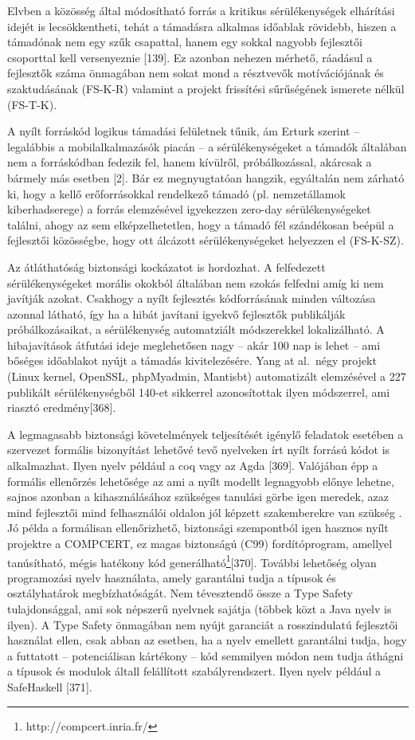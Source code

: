 \documentclass[12pt,magyar,a4paper,oneside]{scrreprt}
\begin{document}
Elvben a közösség által módosítható forrás a kritikus sérülékenységek
elhárítási idejét is lecsökkentheti, tehát a támadásra alkalmas időablak
rövidebb, hiszen a támadónak nem egy szűk csapattal, hanem egy sokkal
nagyobb fejlesztői csoporttal kell versenyeznie {[}139{]}. Ez azonban
nehezen mérhető, ráadásul a fejlesztők száma önmagában nem sokat mond a
résztvevők motívációjának és szaktudásának (FS-K-R) valamint a projekt
frissítési sűrűségének ismerete nélkül (FS-T-K).

A nyílt forráskód logikus támadási felületnek tűnik, ám Erturk szerint
-- legalábbis a mobilalkalmazásók piacán -- a sérülékenységeket a
támadók általában nem a forráskódban fedezik fel, hanem kívülről,
próbálkozással, akárcsak a bármely más esetben {[}2{]}. Bár ez
megnyugtatóan hangzik, egyáltalán nem zárható ki, hogy a kellő
erőforrásokkal rendelkező támadó (pl. nemzetállamok kiberhadserege) a
forrás elemzésével igyekezzen zero-day sérülékenységeket találni, ahogy
az sem elképzelhetetlen, hogy a támadó fél szándékosan beépül a
fejlesztői közösségbe, hogy ott álcázott sérülékenységeket helyezzen el
(FS-K-SZ).

Az átláthatóság biztonsági kockázatot is hordozhat. A felfedezett
sérülékenységeket morális okokból általában nem szokás felfedni amíg ki
nem javítják azokat. Csakhogy a nyílt fejlesztés kódforrásának minden
változása azonnal látható, így ha a hibát javítani igyekvő fejlesztők
publikálják próbálkozásaikat, a sérülékenység automatziált módszerekkel
lokalizálható. A hibajavítások átfutási ideje meglehetősen nagy -- akár
100 nap is lehet -- ami bőséges időablakot nyújt a támadás
kivitelezésére. Yang at al.~négy projekt (Linux kernel, OpenSSL,
phpMyadmin, Mantisbt) automatizált elemzésével a 227 publikált
sérülékenységből 140-et sikkerrel azonosítottak ilyen módszerrel, ami
riasztó eredmény{[}368{]}.

A legmagasabb biztonsági követelmények teljesítését igénylő feladatok
esetében a szervezet formális bizonyítást lehetővé tevő nyelveken írt
nyílt forrású kódot is alkalmazhat. Ilyen nyelv például a coq vagy az
Agda {[}369{]}. Valójában épp a formális ellenőrzés lehetősége az ami a
nyílt modellt legnagyobb előnye lehetne, sajnos azonban a
kihasználásához szükséges tanulási görbe igen meredek, azaz mind
fejlesztői mind felhasználói oldalon jól képzett szakemberekre van
szükség . Jó példa a formálisan ellenőrizhető, biztonsági szempontból
igen hasznos nyílt projektre a COMPCERT, ez magas biztonságú (C99)
fordítóprogram, amellyel tanúsítható, mégis hatékony kód
generálható\footnote{http://compcert.inria.fr/}{[}370{]}. További
lehetőség olyan programozási nyelv használata, amely garantálni tudja a
típusok és osztályhatárok megbízhatóságát. Nem tévesztendő össze a Type
Safety tulajdonsággal, ami sok népszerű nyelvnek sajátja (többek közt a
Java nyelv is ilyen). A Type Safety önmagában nem nyújt garanciát a
rosszindulatú fejlesztői használat ellen, csak abban az esetben, ha a
nyelv emellett garantálni tudja, hogy a futtatott -- potenciálisan
kártékony -- kód semmilyen módon nem tudja áthágni a típusok és modulok
általl felállított szabályrendszert. Ilyen nyelv például a SafeHaskell
{[}371{]}.
\end{document}
